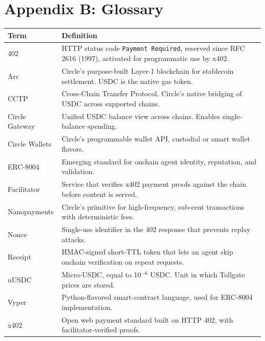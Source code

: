 \documentclass[11pt,a4paper]{article}
\begin{document}
\section*{Appendix B: Glossary}

\begin{table}[H]
\centering
\footnotesize
\begin{tabularx}{\textwidth}{@{} l X @{}}
\toprule
\textbf{Term} & \textbf{Definition} \\
\midrule
402 & HTTP status code \texttt{Payment Required}, reserved since RFC 2616 (1997), activated for programmatic use by x402. \\
Arc & Circle's purpose-built Layer-1 blockchain for stablecoin settlement. USDC is the native gas token. \\
CCTP & Cross-Chain Transfer Protocol, Circle's native bridging of USDC across supported chains. \\
Circle Gateway & Unified USDC balance view across chains. Enables single-balance spending. \\
Circle Wallets & Circle's programmable wallet API, custodial or smart wallet flavors. \\
ERC-8004 & Emerging standard for onchain agent identity, reputation, and validation. \\
Facilitator & Service that verifies x402 payment proofs against the chain before content is served. \\
Nanopayments & Circle's primitive for high-frequency, sub-cent transactions with deterministic fees. \\
Nonce & Single-use identifier in the 402 response that prevents replay attacks. \\
Receipt & HMAC-signed short-TTL token that lets an agent skip onchain verification on repeat requests. \\
uUSDC & Micro-USDC, equal to 10$^{-6}$ USDC. Unit in which Tollgate prices are stored. \\
Vyper & Python-flavored smart-contract language, used for ERC-8004 implementation. \\
x402 & Open web payment standard built on HTTP 402, with facilitator-verified proofs. \\
\bottomrule
\end{tabularx}
\end{table}
\end{document}

